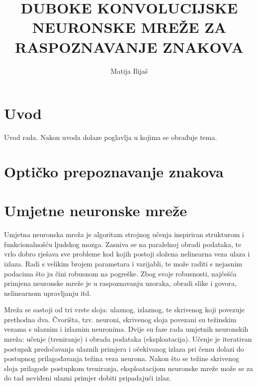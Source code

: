 \documentclass[lmodern, utf8, diplomski, numeric]{fer}
\begin{document}

\title{DUBOKE KONVOLUCIJSKE NEURONSKE MREŽE ZA RASPOZNAVANJE ZNAKOVA}

\author{Matija Ilijaš}

\maketitle

\izvornik

\zahvala{}

\tableofcontents

\chapter{Uvod}
Uvod rada. Nakon uvoda dolaze poglavlja u kojima se obrađuje tema.

\chapter{Optičko prepoznavanje znakova}

\chapter{Umjetne neuronske mreže}

Umjetna neuronska mreža je algoritam strojnog učenja inspiriran strukturom i funkcionalnošću ljudskog mozga. Zasniva se na paralelnoj obradi podataka, te vrlo dobro rješava sve probleme kod kojih postoji složena nelinearna veza ulaza i izlaza. Radi s velikim brojem parametara i varijabli, te može raditi s nejasnim podacima što ju čini robusnom na pogreške. Zbog svoje robusnosti, najčešća primjena neuronske mreže je u raspoznavanju uzoraka, obradi slike i govora, nelinearnom upravljanju itd.

Mreža se sastoji od tri vrste sloja: ulaznog, izlaznog, te skrivenog koji povezuje prethodna dva. Čvorišta, tzv. neuroni, skrivenog sloja povezani su težinskim vezama s ulaznim i izlaznim neuronima. Dvije su faze rada umjetnih neuronskih mreža: učenje (treniranje) i obrada podataka (eksploatacija). Učenje je iterativan postupak predočavanja ulaznih primjera i očekivanog izlaza pri čemu dolazi do postupnog prilagođavanja težina veza neurona. Nakon što se težine skrivenog sloja prilagode postupkom treniranja, eksploatacijom neuronske mreže može se za do tad neviđeni ulazni primjer dobiti pripadajući izlaz.
\end{document}
